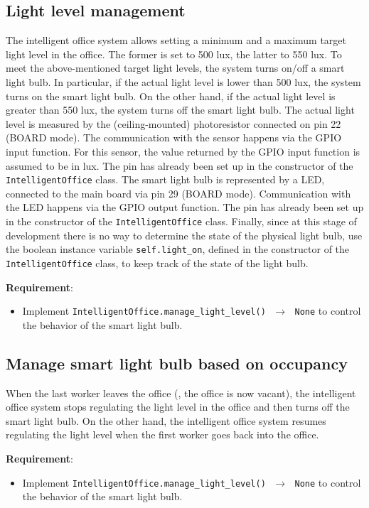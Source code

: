 \subsection{Light level management}
The intelligent office system allows setting a minimum and a maximum target light level in the office. The former is set to 500 lux, the latter to 550 lux. 
To meet the above-mentioned target light levels, the system turns on/off a smart light bulb. In particular, if the actual light level is lower than 500 lux, the system turns on the smart light bulb. On the other hand, if the actual light level is greater than 550 lux, the system turns off the smart light bulb. 
The actual light level is measured by the (ceiling-mounted) photoresistor connected on pin 22 (BOARD mode). The communication with the sensor happens via the GPIO input function. For this sensor, the value returned by the GPIO input function is assumed to be in lux. The pin has already been set up in the constructor of the \texttt{ IntelligentOffice} class. 
The smart light bulb is represented by a LED, connected to the main board via pin 29 (BOARD mode). Communication with the LED happens via the GPIO output function. The pin has already been set up in the constructor of  the \texttt{IntelligentOffice} class.
Finally, since at this stage of development there is no way to determine the state of the physical light bulb, use the boolean instance variable \texttt{self.light\_on}, defined in the constructor of the \texttt{IntelligentOffice} class, to keep track of the state of the light bulb.

\noindent\textbf{Requirement}:
\begin{itemize}
    \item Implement \texttt{IntelligentOffice.manage\_light\_level() $\,\to\,$ None} to control the behavior of the smart light bulb.
\end{itemize}


\subsection{Manage smart light bulb based on occupancy}
When the last worker leaves the office (\ie, the office is now vacant), the intelligent office system stops regulating the light level in the office and then turns off the smart light bulb. 
On the other hand, the intelligent office system resumes regulating the light level when the first worker goes back into the office. 

\noindent\textbf{Requirement}:
\begin{itemize}
    \item Implement \texttt{IntelligentOffice.manage\_light\_level() $\,\to\,$ None} to control the behavior of the smart light bulb.
\end{itemize}



